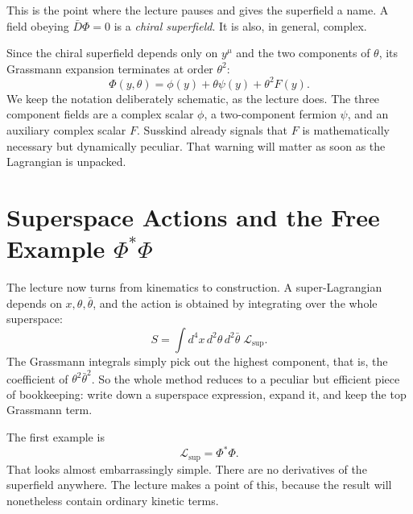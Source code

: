 This is the point where the lecture pauses and gives the superfield a name. A field obeying \(\bar D\Phi=0\) is a \emph{chiral superfield}. It is also, in general, complex.

Since the chiral superfield depends only on \(y^\mu\) and the two components of \(\theta\), its Grassmann expansion terminates at order \(\theta^2\):
\begin{equation}
\Phi(y,\theta)=\phi(y)+\theta\psi(y)+\theta^2 F(y).
\end{equation}
We keep the notation deliberately schematic, as the lecture does. The three component fields are a complex scalar \(\phi\), a two-component fermion \(\psi\), and an auxiliary complex scalar \(F\). Susskind already signals that \(F\) is mathematically necessary but dynamically peculiar. That warning will matter as soon as the Lagrangian is unpacked.

\section{Superspace Actions and the Free Example \(\Phi^\ast\Phi\)}

The lecture now turns from kinematics to construction. A super-Lagrangian depends on \(x,\theta,\bar\theta\), and the action is obtained by integrating over the whole superspace:
\begin{equation}
S=\int d^4x\,d^2\theta\,d^2\bar\theta\;\mathcal L_{\mathrm{sup}}.
\end{equation}
The Grassmann integrals simply pick out the highest component, that is, the coefficient of \(\theta^2\bar\theta^2\). So the whole method reduces to a peculiar but efficient piece of bookkeeping: write down a superspace expression, expand it, and keep the top Grassmann term.

The first example is
\begin{equation}
\mathcal L_{\mathrm{sup}}=\Phi^\ast\Phi.
\end{equation}
That looks almost embarrassingly simple. There are no derivatives of the superfield anywhere. The lecture makes a point of this, because the result will nonetheless contain ordinary kinetic terms.

